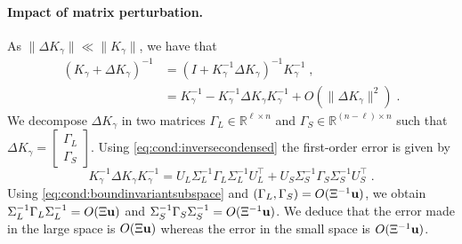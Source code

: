 \paragraph{Impact of matrix perturbation.}
As $\|\Delta K_\gamma\| \ll \|K_\gamma\|$, we have that
\begin{equation}
  \label{eq:cond:invperturbed}
  \begin{aligned}
    (K_\gamma + \Delta K_\gamma)^{-1} &= (I + K_\gamma^{-1} \Delta K_\gamma)^{-1} K_\gamma^{-1} \; , \\
                                      &= K_\gamma^{-1} - K_\gamma^{-1}\Delta K_\gamma K_\gamma^{-1} + O(\|\Delta K_\gamma\|^2) \; .
  \end{aligned}
\end{equation}
We decompose $\Delta K_\gamma$ in two matrices
$\Gamma_L \in \mathbb{R}^{\ell \times n}$ and $\Gamma_S \in \mathbb{R}^{(n-\ell) \times n}$ such that
$\Delta K_\gamma = \begin{bmatrix}
  \Gamma_L \\ \Gamma _S
\end{bmatrix}$.
Using \eqref{eq:cond:inversecondensed} the first-order error is given by
\begin{equation}
  \label{eq:cond:inversecondensederror}
  K_\gamma^{-1}\Delta K_\gamma K_\gamma^{-1}  =
U_L \Sigma_L^{-1} \Gamma_L \Sigma_L^{-1}U_L^\top  +
  U_S \Sigma_S^{-1} \Gamma_S \Sigma_S^{-1}U_S^\top  \;.
\end{equation}
Using \eqref{eq:cond:boundinvariantsubspace} and $(\Gamma_L, \Gamma_S)= O( \Xi^{-1}\mathbf{u})$,
we obtain $\Sigma_L^{-1} \Gamma_L \Sigma_L^{-1} = O(\Xi \mathbf{u})$
and $\Sigma_S^{-1} \Gamma_S \Sigma_S^{-1} = O(\Xi^{-1} \mathbf{u})$.
We deduce that the error made in the large space is $O(\Xi\mathbf{u})$ whereas
the error in the small space is $O(\Xi^{-1}\mathbf{u} )$.


